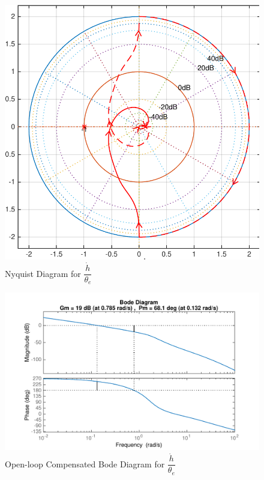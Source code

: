 \documentclass[11pt]{article}
\begin{document}
\begin{figure}[b!]
\begin{center}
\includegraphics[height=.4\textheight]{figures/nyquist_hdot}
\caption{Nyquist Diagram for $\dfrac{\dot{h}}{\theta_e}$}
\end{center}
\end{figure}

\begin{figure}[h!]
\begin{center}
\includegraphics[height=.4\textheight]{figures/open_comp_hdot}
\caption{Open-loop Compensated Bode Diagram for $\dfrac{\dot{h}}{\theta_e}$}
\end{center}
\end{figure}
\end{document}

